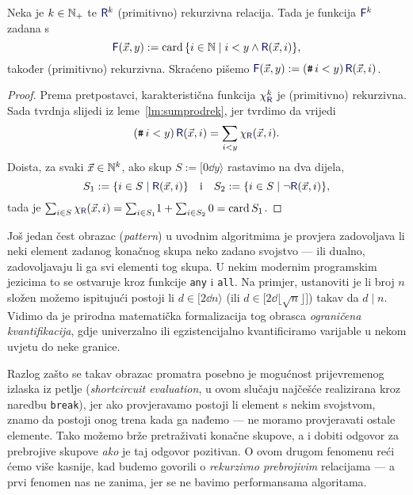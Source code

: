 \begin{lema}[{name=[ograničeno brojenje čuva (primitivnu) rekurzivnost]}]\label{lm:brojrek}
\!Neka je $k\in{\mathbb N}_+$ te $\f R^k$ (primitivno) rekurzivna relacija. Tada je funkcija $\f F^k$ zadana s
\begin{equation}
    \f F(\vec x,y):=\card\,\{i\in\N\mid i<y\land\f R(\vec x,i)\}\text,
\end{equation}
također (primitivno) rekurzivna. Skraćeno pišemo $\f F(\vec x,y):=(\num i<y)\,\f R(\vec x,i)$.
\end{lema}
\begin{proof}
    Prema pretpostavci, karakteristična funkcija $\chi_{\f R}^k$ je (primitivno) rekurzivna. Sada tvrdnja slijedi iz leme~\ref{lm:sumprodrek}, jer tvrdimo da vrijedi
	\begin{equation}\label{eq:countsum}
        (\num i<y)\,\f R(\vec x,i)=\sum_{i<y}\chi_{\f R}(\vec x,i)\text.
    \end{equation}
    Doista, za svaki $\vec x\in{\mathbb N}^k$, ako skup $S:=[0\dd y\rangle$ rastavimo na dva dijela,
    \begin{equation}
	    S_1:=\{i\in S\mid\f R(\vec x,i)\}\quad\text i\quad
        S_2:=\{i\in S\mid\lnot\f R(\vec x,i)\}\text,
    \end{equation}
    tada je
        $\sum_{i\in S}\chi_{\f R}(\vec x,i)=\sum_{i\in S_1}\!1+\sum_{i\in S_2}0=\card S_1$.
\end{proof}


Još jedan čest obrazac (\emph{pattern}) u uvodnim algoritmima je provjera zadovoljava li neki element zadanog konačnog skupa neko zadano svojstvo --- ili dualno, zadovoljavaju li ga svi elementi tog skupa. U nekim modernim programskim jezicima to se ostvaruje kroz funkcije \texttt{any} i \texttt{all}. Na primjer, ustanoviti je li broj $n$ složen možemo ispitujući postoji li $d\in[2\dd n\rangle$ (ili $d\in\bigl[2\dd \lfloor\!\sqrt{n}\rfloor\bigr]$) takav da $d\mathrel|n$. Vidimo da je prirodna matematička formalizacija tog obrasca \emph{ograničena kvantifikacija}, gdje univerzalno ili egzistencijalno kvantificiramo varijable u nekom uvjetu do neke granice.

Razlog zašto se takav obrazac promatra posebno je mogućnost prijevremenog izlaska iz petlje (\emph{shortcircuit evaluation}, u ovom slučaju najčešće realizirana kroz naredbu \texttt{break}), jer ako provjeravamo postoji li element s nekim svojstvom, znamo da postoji onog trena kada ga nađemo --- ne moramo provjeravati ostale elemente. Tako možemo brže pretraživati konačne skupove, a i dobiti odgovor za prebrojive skupove \emph{ako} je taj odgovor pozitivan. O ovom drugom fenomenu reći ćemo više kasnije, kad budemo govorili o \emph{rekurzivno prebrojivim} relacijama --- a prvi fenomen nas ne zanima, jer se ne bavimo performansama algoritama.

